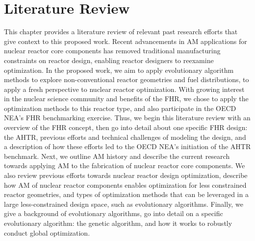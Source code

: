 \chapter{Literature Review}
\label{chap:lit-review}

This chapter provides a literature review of relevant past research efforts 
that give context to this proposed work.
Recent advancements in \gls{AM} applications for nuclear reactor core 
components has removed traditional manufacturing constraints on reactor design, 
enabling reactor designers to reexamine optimization.
In the proposed work, we aim to apply evolutionary algorithm methods to explore 
non-conventional reactor geometries and fuel distributions, to apply a fresh 
perspective to nuclear reactor optimization. 
With growing interest in the nuclear science community and benefits of the 
\gls{FHR}, we chose to apply the optimization methods to this reactor type, 
and also participate in the \gls{OECD} \gls{NEA}'s \gls{FHR} benchmarking exercise. 
Thus, we begin this literature review with an overview of the \gls{FHR} concept, 
then go into detail about one specific \gls{FHR} design: the \gls{AHTR}, 
previous efforts and technical challenges of modeling the design, and a 
description of how these efforts led to the \gls{OECD} \gls{NEA}'s initiation of 
the \gls{AHTR} benchmark.
Next, we outline \gls{AM} history and describe the current research towards applying 
\gls{AM} to the fabrication of nuclear reactor core components. 
We also review previous efforts towards nuclear reactor design optimization, 
describe how \gls{AM} of nuclear reactor components enables optimization for 
less constrained reactor geometries, and types of optimization methods that can be 
leveraged in a large less-constrained design space, such as evolutionary algorithms.  
Finally, we give a background of evolutionary algorithms, go into detail on a 
specific evolutionary algorithm: the genetic algorithm, and how it works to robustly conduct global 
optimization. 

